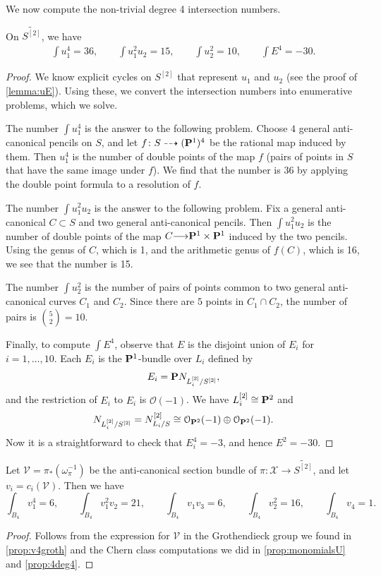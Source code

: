 \documentclass[12pt,reqno]{amsart}
\renewcommand{\to}{{\longrightarrow}}
\numberwithin{equation}{section}
\renewcommand{\O}{\mathcal O}
\begin{document}
We now compute the non-trivial degree 4 intersection numbers.
\begin{proposition}
  \label{prop:monomialsU}
  On $\widetilde{S^{[2]}}$, we have
  \[
    \begin{split}
      \int u_{1}^{4} = 36, \qquad   \int u_{1}^{2}u_{2} = 15, \qquad 
      \int  u_{2}^{2} = 10, \qquad    \int  E^{4} = -30.
    \end{split}
\]
\end{proposition}
\begin{proof}
  We know explicit cycles on $S^{[2]}$ that represent $u_1$ and $u_2$ (see the proof of \autoref{lemma:uE}).
  Using these, we convert the intersection numbers into enumerative problems, which we solve.

  The number $\int u_1^4$ is the answer to the following problem.
  Choose $4$ general anti-canonical pencils on $S$, and let $f \colon S \dashrightarrow (\P^1)^4$ be the rational map induced by them.
  Then $u_1^4$ is the number of double points of the map $f$ (pairs of points in $S$ that have the same image under $f$).
  We find that the number is 36 by applying the double point formula \cite[Theorem~2]{ful:78} to a resolution of $f$.

  The number $\int u_{1}^{2}u_{2}$ is the answer to the following problem.
  Fix a general anti-canonical $C \subset S$ and two general anti-canonical pencils.
  Then $\int u_1^2u_2$ is the number of double points of the map $C \to \P^1 \times \P^1$ induced by the two pencils.
  Using the genus of $C$, which is 1, and the arithmetic genus of $f(C)$, which is 16, we see that the number is 15.

  The number $\int u_2^2$ is the number of pairs of points common to two general anti-canonical curves $C_1$ and $C_2$.
  Since there are $5$ points in $C_1 \cap C_2$, the number of pairs is ${5 \choose 2} = 10$.

  Finally, to compute $\int E^4$, observe that $E$ is the disjoint union of $E_i$ for $i = 1, \dots, 10$.
  Each $E_i$ is the $\P^1$-bundle over $L_i$ defined by
  \[ E_i = \P N_{L_i^{[2]}/S^{[2]}},\]
  and the restriction of $E_i$ to $E_i$ is $\O(-1)$.
  We have $L_i^{[2]} \cong \P^2$ and
  \[ N_{L_i^{[2]}/S^{[2]}} = N_{L_i/S}^{[2]} \cong \O_{\P^2}(-1) \oplus \O_{\P^2}(-1).\]
  Now it is a straightforward to check that $E_i^4 = -3$, and hence $E^2 = -30$.
\end{proof}
\begin{proposition}\label{prop:4deg4}
  Let $\mathcal V = \pi_*\left(  \omega_{\pi}^{-1} \right)$ be the anti-canonical section bundle of $\pi \colon \mathcal X \to \widetilde{S^{[2]}}$,
  and let $v_i = c_i(\mathcal V)$.
  Then we have
  \[
    \int_{B_{4}} v_{1}^{4} = 6, \qquad
    \int_{B_{4}} v_{1}^{2}v_{2} = 21, \qquad
      \int_{B_{4}} v_{1}v_{3} = 6, \qquad
      \int_{B_{4}} v_{2}^{2} = 16, \qquad
      \int_{B_{4}} v_{4} = 1.
  \]
\end{proposition}
\begin{proof}
  Follows from the expression for $\mathcal V$ in the Grothendieck group we found in \autoref{prop:v4groth} and the Chern class computations we did in \autoref{prop:monomialsU} and \autoref{prop:4deg4}.
\end{proof}
\end{document}
